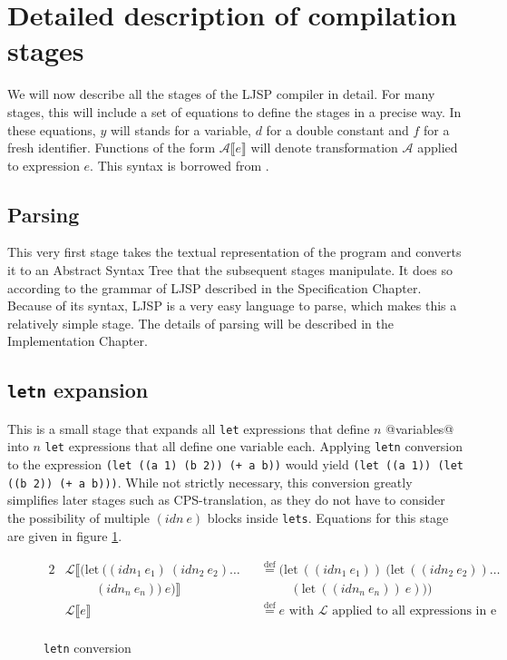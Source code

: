 \documentclass[11pt]{report}
\newcommand{\eqdef}{\stackrel{\text{def}}{=}}%
\begin{document}
\section{Detailed description of compilation stages}
We will now describe all the stages of the LJSP compiler in detail. For many stages, this will include a set of equations to define the stages in a precise way. In these equations, $y$ will stands for a variable, $d$ for a double constant and $f$ for a fresh identifier. Functions of the form $\mathcal{A}\llbracket e \rrbracket$ will denote transformation $\mathcal{A}$ applied to expression $e$. This syntax is borrowed from \cite{sysftal}.

\subsection{Parsing}
This very first stage takes the textual representation of the program and converts it to an Abstract Syntax Tree that the subsequent stages manipulate. It does so according to the grammar of LJSP described in the Specification Chapter. Because of its syntax, LJSP is a very easy language to parse, which makes this a relatively simple stage. The details of parsing will be described in the Implementation Chapter.

\subsection{\texttt{letn} expansion}
This is a small stage that expands all \texttt{let} expressions that define $n$ @variables@ into $n$ \texttt{let} expressions that all define one variable each. Applying \texttt{letn} conversion to the expression \texttt{(let ((a 1) (b 2)) (+ a b))} would yield \texttt{(let ((a 1)) (let ((b 2)) (+ a b)))}. While not strictly necessary, this conversion greatly simplifies later stages such as CPS-translation, as they do not have to consider the possibility of multiple $(idn\ e)$ blocks inside \texttt{lets}. Equations for this stage are given in figure \ref{letnconversion}.

\begin{figure}[ht]
\begin{alignat*}{2}
&\mathcal{L}\llbracket (\text{let}\ ((idn_1\ e_1)\ (idn_2\ e_2)\dots &&\eqdef (\text{let}\ ((idn_1\ e_1))\ (\text{let}\ ((idn_2\ e_2)) \dots \\
&\hspace{1cm} (idn_n\ e_n))\ e)\rrbracket &&\hspace{1cm}(\text{let}\ ((idn_n\ e_n))\ e)))\\
&\mathcal{L}\llbracket e \rrbracket && \eqdef e\text{ with $\mathcal{L}$ applied to all expressions in e}\\
\end{alignat*}
\caption{\texttt{letn} conversion}
\label{letnconversion}
\end{figure}
\end{document}
